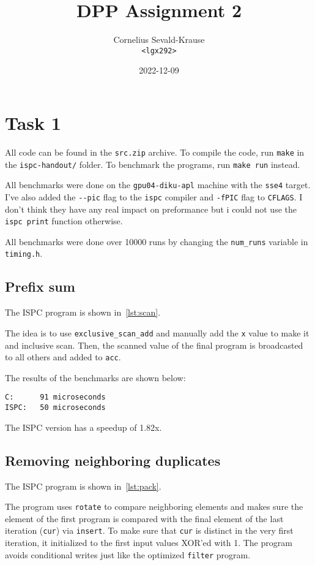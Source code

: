 \documentclass{article}
\begin{document}
\title{DPP Assignment 2}
\author{Cornelius Sevald-Krause \\ \texttt{<lgx292>}}
\date{2022-12-09}
\maketitle

\section*{Task 1}

All code can be found in the \verb|src.zip| archive. To compile the code,
run \verb|make| in the \verb|ispc-handout/| folder. To benchmark the programs,
run \verb|make run| instead.

All benchmarks were done on the \verb|gpu04-diku-apl| machine with the
\verb|sse4| target. I've also added the \verb|--pic| flag to the
\verb|ispc| compiler and \verb|-fPIC| flag to \verb|CFLAGS|. I don't think they
have any real impact on preformance but i could not use the \verb|ispc print|
function otherwise.

All benchmarks were done over 10000 runs by changing the \verb|num_runs|
variable in \verb|timing.h|.

\subsection*{Prefix sum}

\noindent
The ISPC program is shown in~\cref{lst:scan}.

The idea is to use \verb|exclusive_scan_add| and manually add the \verb|x| value
to make it and inclusive scan. Then, the scanned value of the final program is
broadcasted to all others and added to \verb|acc|.

The results of the benchmarks are shown below:
\begin{Verbatim}
C:      91 microseconds
ISPC:   50 microseconds
\end{Verbatim}
The ISPC version has a speedup of \textapprox 1.82x.

\subsection*{Removing neighboring duplicates}

\noindent
The ISPC program is shown in~\cref{lst:pack}.

The program uses \verb|rotate| to compare neighboring elements and makes sure
the element of the first program is compared with the final element of the last
iteration (\verb|cur|) via \verb|insert|. To make sure that \verb|cur| is
distinct in the very first iteration, it initialized to the first input values
XOR'ed with 1. The program avoids conditional writes just like the optimized
\verb|filter| program.
\end{document}
